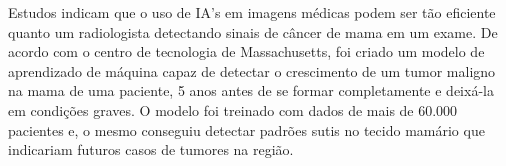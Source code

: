 Estudos indicam que o uso de IA's em imagens médicas podem ser tão eficiente quanto um radiologista detectando sinais de câncer de mama em um exame. De acordo com o centro de tecnologia de Massachusetts, foi criado um modelo de aprendizado de máquina capaz de detectar o crescimento de um tumor maligno na mama de uma paciente, 5 anos antes de se formar completamente e deixá-la em condições graves. \cite{MIT1} O modelo foi treinado com dados de mais de 60.000 pacientes e, o mesmo conseguiu detectar padrões sutis no tecido mamário que indicariam futuros casos de tumores na região. 



